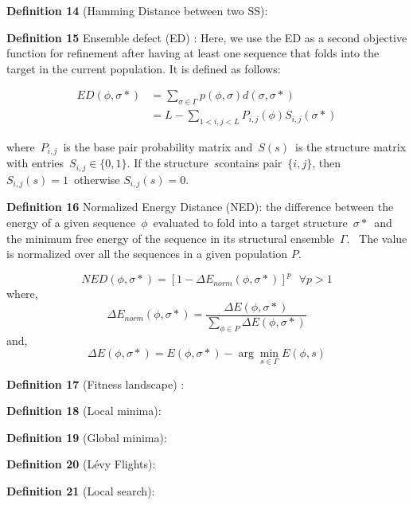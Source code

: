 \textbf{Definition 14} (Hamming Distance between two SS): 

\textbf{Definition 15} Ensemble defect (ED) \citep{zadeh2011nucleic}: Here, we use the ED as a second objective function for refinement after having at least one sequence that folds into the target in the current population. It is defined as follows: ~

\begin{equation}
\label{ed}
\begin{split}
ED(\phi, \sigma*) &= \sum_{\sigma \in \Gamma}{p(\phi, \sigma)d(\sigma, \sigma*)}\\
&= L - \sum_{1<i,j<L} P_{i,j}(\phi)S_{i,j}(\sigma*)
\end{split}
\end{equation}

where~\(P_{i,j}\)~is the base pair probability matrix and~\(S(s)\)~is the structure matrix with entries~\(S_{i,j} \in  \{ 0, 1\}\). If the structure~\(s\)contains pair~\(\{i ,j\}\), then~\(S_{i,j}(s) = 1\)~otherwise \(S_{i,j}(s) = 0\).

\textbf{Definition 16} Normalized Energy Distance (NED): the difference between
the energy of a given sequence~\(\phi\)~evaluated to fold
into a target structure~\(\sigma*\)~and the minimum free energy
of the sequence in its structural ensemble~\(\Gamma\).~ The value is normalized over all the sequences in a given population $P$.  


\begin{equation}
\label{ned}
NED(\phi, \sigma*) = [1-\Delta E_{norm}(\phi, \sigma*)]^p \text{   } \forall p>1
\end{equation}
where,
\begin{equation}
\Delta E_{norm}(\phi, \sigma*) = \frac{\Delta E(\phi, \sigma*) }{\sum_{\phi \in P}{\Delta E(\phi, \sigma*)}}
\end{equation}
and,
\begin{equation}
\Delta E(\phi, \sigma*) = E(\phi, \sigma*) - \arg \min_{s \in \Gamma} E(\phi, s)
\end{equation}

\textbf{Definition 17} (Fitness landscape) : 


\textbf{Definition 18} (Local minima): 

\textbf{Definition 19} (Global minima): 

\textbf{Definition 20} (Lévy Flights): 

\textbf{Definition 21} (Local search): 

